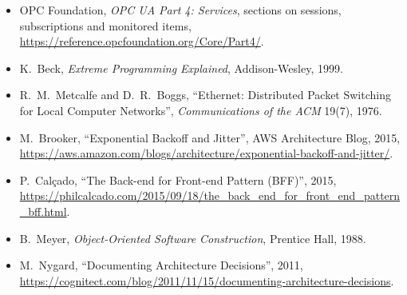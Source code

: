 \begin{itemize}
  \item OPC Foundation, \emph{OPC UA Part 4: Services}, sections on sessions,
        subscriptions and monitored items,
        \url{https://reference.opcfoundation.org/Core/Part4/}.
  \item K.\ Beck, \emph{Extreme Programming Explained}, Addison-Wesley, 1999.
  \item R.~M.\ Metcalfe and D.~R.\ Boggs, ``Ethernet: Distributed Packet
        Switching for Local Computer Networks'', \emph{Communications of the
        ACM} 19(7), 1976.
  \item M.\ Brooker, ``Exponential Backoff and Jitter'', AWS Architecture Blog,
        2015,
        \url{https://aws.amazon.com/blogs/architecture/exponential-backoff-and-jitter/}.
  \item P.\ Calçado, ``The Back-end for Front-end Pattern (BFF)'', 2015,
        \url{https://philcalcado.com/2015/09/18/the_back_end_for_front_end_pattern_bff.html}.
  \item B.\ Meyer, \emph{Object-Oriented Software Construction}, Prentice Hall,
        1988.
  \item M.\ Nygard, ``Documenting Architecture Decisions'', 2011,
        \url{https://cognitect.com/blog/2011/11/15/documenting-architecture-decisions}.
\end{itemize}
